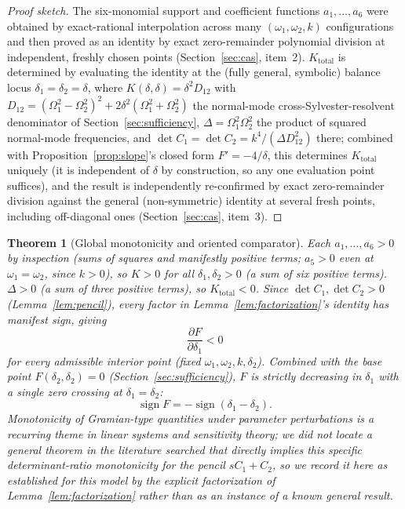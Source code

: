 \documentclass[11pt]{article}
\newtheorem{theorem}{Theorem}
\theoremstyle{definition}
\newcommand{\dd}[2]{\frac{\partial #1}{\partial #2}}
\begin{document}
\begin{proof}[Proof sketch]
The six-monomial support and coefficient functions $a_1,\dots,a_6$ were
obtained by exact-rational interpolation across many
$(\omega_1,\omega_2,k)$ configurations and then proved as an identity by
exact zero-remainder polynomial division at independent, freshly chosen
points (Section~\ref{sec:cas}, item~2). $K_{\mathrm{total}}$ is
determined by evaluating the identity at the (fully general, symbolic)
balance locus $\delta_1=\delta_2=\delta$, where $K(\delta,\delta)=
\delta^2D_{12}$ with $D_{12}=(\Omega_1^2-\Omega_2^2)^2+2\delta^2
(\Omega_1^2+\Omega_2^2)$ the normal-mode cross-Sylvester-resolvent
denominator of Section~\ref{sec:sufficiency}, $\Delta=\Omega_1^2\Omega_2^2$
the product of squared normal-mode frequencies, and $\det C_1=\det C_2=
k^4/(\Delta D_{12}^2)$ there; combined with Proposition~\ref{prop:slope}'s
closed form $F'=-4/\delta$, this determines $K_{\mathrm{total}}$
uniquely (it is independent of $\delta$ by construction, so any one
evaluation point suffices), and the result is independently re-confirmed
by exact zero-remainder division against the general (non-symmetric)
identity at several fresh points, including off-diagonal ones
(Section~\ref{sec:cas}, item~3).
\end{proof}

\begin{theorem}[Global monotonicity and oriented comparator]
\label{thm:monotone}
Each $a_1,\dots,a_6>0$ by inspection (sums of squares and manifestly
positive terms; $a_5>0$ even at $\omega_1=\omega_2$, since $k>0$), so
$K>0$ for all $\delta_1,\delta_2>0$ (a sum of six positive terms).
$\Delta>0$ (a sum of three positive terms), so $K_{\mathrm{total}}<0$.
Since $\det C_1,\det C_2>0$ (Lemma~\ref{lem:pencil}), every factor in
Lemma~\ref{lem:factorization}'s identity has manifest sign, giving
\[
\dd{F}{\delta_1} < 0
\]
for every admissible interior point (fixed $\omega_1,\omega_2,k,\delta_2$).
Combined with the base point $F(\delta_2,\delta_2)=0$
(Section~\ref{sec:sufficiency}), $F$ is strictly decreasing in $\delta_1$
with a single zero crossing at $\delta_1=\delta_2$:
\[
\operatorname{sign}F = -\operatorname{sign}(\delta_1-\delta_2).
\]
Monotonicity of Gramian-type quantities under parameter perturbations is
a recurring theme in linear systems and sensitivity theory; we did not
locate a general theorem in the literature searched that directly implies
this specific determinant-ratio monotonicity for the pencil $sC_1+C_2$,
so we record it here as established for this model by the explicit
factorization of Lemma~\ref{lem:factorization} rather than as an instance
of a known general result.
\end{theorem}
\end{document}
